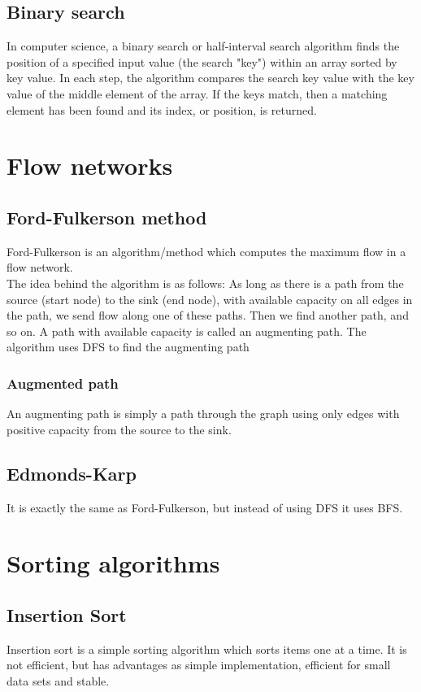 \documentclass[a4paper, 10pt]{article}
\begin{document}
\begin{algorithmic}
\begin{algoritmic}
{{{{{{{\end{algoritmic}

\subsection{Binary search}
In computer science, a binary search or half-interval search algorithm finds the position of a specified input value (the search "key") within an array sorted by key value. In each step, the algorithm compares the search key value with the key value of the middle element of the array. If the keys match, then a matching element has been found and its index, or position, is returned.

\section{Flow networks}
\subsection{Ford-Fulkerson method}
Ford-Fulkerson is an algorithm/method which computes the maximum flow in a flow network. \\
The idea behind the algorithm is as follows: As long as there is a path from the source (start node) to the sink (end node), with available capacity on all edges in the path, we send flow along one of these paths. Then we find another path, and so on. A path with available capacity is called an augmenting path.
The algorithm uses DFS to find the augmenting path
\subsubsection{Augmented path}
An augmenting path is simply a path through the graph using only edges with positive capacity from the source to the sink.
\subsection{Edmonds-Karp}
It is exactly the same as Ford-Fulkerson, but instead of using DFS  it uses BFS.


\section{Sorting algorithms}
\subsection{Insertion Sort}
Insertion sort is a simple sorting algorithm which sorts items one at a time. It is not efficient, but has advantages as simple implementation, efficient for small data sets and stable.
\\


\end{algorithmic}
\end{document}

